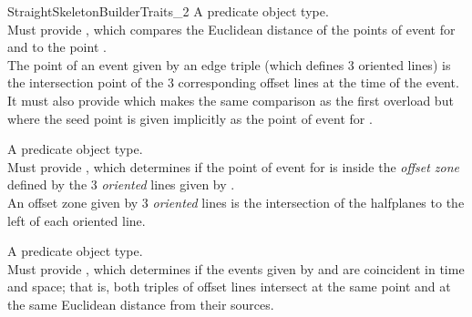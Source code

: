 \begin{ccRefConcept}{StraightSkeletonBuilderTraits_2}
{A predicate object type.\\
Must provide , which compares the Euclidean distance of the points of event for  and  to the point .\\
The point of an event given by an edge triple (which defines 3 oriented lines) is the intersection point of the 3 corresponding offset lines at the time  of the event.\\
It must also provide  which makes the same comparison as the first overload but where the seed point is given implicitly as the point of event for .\\
}

{A predicate object type.\\
Must provide , which determines if the point of event for  is inside the \textit{offset zone} defined by the 3 \textit{oriented} lines given by .\\
An offset zone given by 3 \textit{oriented} lines is the intersection of the halfplanes to the left of each oriented line.\\
}

{A predicate object type.\\
Must provide , which determines if the events given by  and  are coincident in time and space; that is, both triples of offset lines intersect at the same point and at the same Euclidean distance from their sources.\\
}


\end{ccRefConcept}
